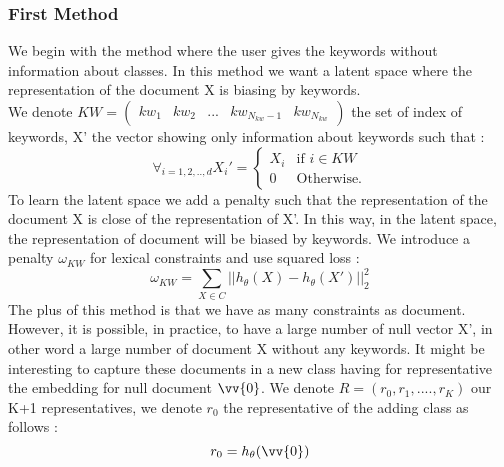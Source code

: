 \subsubsection{First Method}
We begin with the method where the user gives the keywords without information
about classes. In this method we want a latent space where the representation
of the document X is biasing by keywords.\\
We denote $KW = \begin{pmatrix} kw_1 & kw_2 & ... & kw_{N_{kw}-1} & kw_{N_{kw}}
\end {pmatrix}$
the set of index of keywords, X' the vector showing only information about 
keywords such that :
\begin{equation}
\forall_{i=1,2,..,d}X_i' = \left\{
\begin{array}{ll}
  X_i & \mbox{if } i \in KW \\
  0 & \mbox{Otherwise.}
\end{array}
\right.
\end{equation}
To learn the latent space we add a penalty such that the representation
of the document X is close of the representation of X'. In this way, in the
latent space, the representation of document will be biased by keywords.
We introduce a penalty $\omega_{KW}$ for lexical constraints and
use squared loss : 
\begin{equation}\label{eq:omega1}
  \omega_{KW} = \sum\limits_{X \in C} || h_\theta(X) - h_\theta(X')||_2^2
\end{equation}
The plus of this method is that we have as many constraints as document. 
However, it is possible, in practice, to have a large number of null vector X', 
in other word a large number of  document X without any keywords.
It might be interesting to capture these documents in a new class having
for representative the embedding for null document $\vv{0}$. We denote    
$R=(r_0, r_1, ...., r_K)$ our K+1 representatives, we denote 
$r_0$ the representative of the adding class as follows : 
\begin{equation}
r_0 = h_\theta(\vv{0})
\end{equation}

